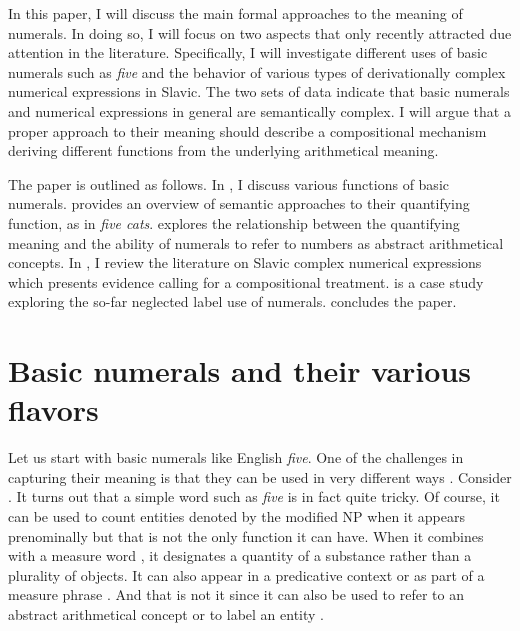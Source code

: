 \documentclass[output=paper]{langscibook}
\begin{document}
	In this paper, I will discuss the main formal approaches to the meaning of numerals. In doing so, I will focus on two aspects that only recently attracted due attention in the literature. Specifically, I will investigate different uses of basic numerals such as \textit{five} and the behavior of various types of derivationally complex numerical expressions in Slavic. The two sets of data indicate that basic numerals and numerical expressions in general are semantically complex. I will argue that a proper approach to their meaning should describe a compositional mechanism deriving different functions from the underlying arithmetical meaning. 
	
	The paper is outlined as follows. In , I discuss various functions of basic numerals.  provides an overview of semantic approaches to their quantifying function, as in \textit{five cats}.  explores the relationship between the quantifying meaning and the ability of numerals to refer to numbers as abstract arithmetical concepts. In , I review the literature on Slavic complex numerical expressions which presents evidence calling for a compositional treatment.  is a case study exploring the so-far neglected label use of numerals.  concludes the paper.
	
	\section{Basic numerals and their various flavors}\label{sec:basic-numerals-and-their-various-flavors}
	
	Let us start with basic numerals like English \textit{five}. One of the challenges in capturing their meaning is that they can be used in very different ways \citep{bultinck2005numerous,geurts2006take}. Consider . It turns out that a simple word such as \textit{five} is in fact quite tricky. Of course, it can be used to count entities denoted by the modified NP when it appears prenominally  but that is not the only function it can have. When it combines with a measure word , it designates a quantity of a substance rather than a plurality of objects. It can also appear in a predicative context  or as part of a measure phrase . And that is not it since it can also be used to refer to an abstract arithmetical concept  or to label an entity .
	
\end{document}
